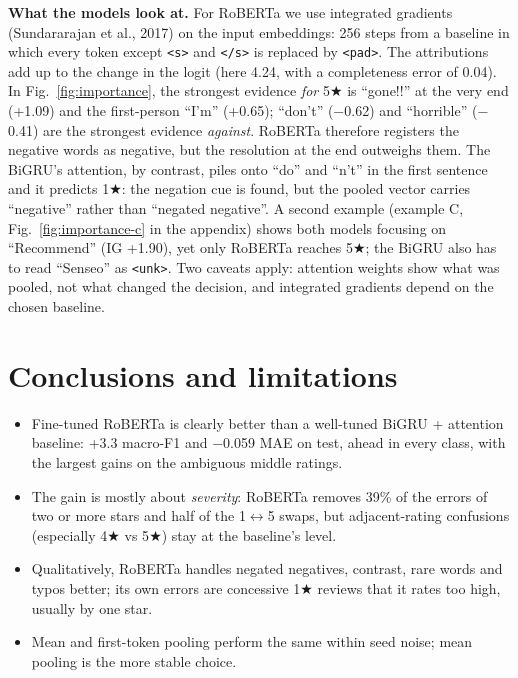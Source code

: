 \documentclass[10pt,a4paper]{article}
\newcommand{\st}[1]{#1$\bigstar$}
\newcommand{\code}[1]{\texttt{#1}}
\begin{document}
\textbf{What the models look at.} For RoBERTa we use integrated gradients (Sundararajan et al., 2017) on the input
embeddings: 256 steps from a baseline in which every token except \code{<s>} and \code{</s>} is replaced by
\code{<pad>}. The attributions add up to the change in the logit (here 4.24, with a completeness error of 0.04).
In Fig.~\ref{fig:importance}, the strongest evidence \emph{for} \st{5} is ``gone!!'' at the very end (+1.09) and
the first-person ``I'm'' (+0.65); ``don't'' ($-$0.62) and ``horrible'' ($-$0.41) are the strongest evidence
\emph{against}. RoBERTa therefore registers the negative words as negative, but the resolution at the end outweighs
them. The BiGRU's attention, by contrast, piles onto ``do'' and ``n't'' in the first sentence and it predicts \st{1}:
the negation cue is found, but the pooled vector carries ``negative'' rather than ``negated negative''. A second
example (example C, Fig.~\ref{fig:importance-c} in the appendix) shows both models focusing on ``Recommend'' (IG +1.90),
yet only RoBERTa reaches \st{5}; the BiGRU also has to read ``Senseo'' as \code{<unk>}. Two caveats apply: attention
weights show what was pooled, not what changed the decision, and integrated gradients depend on the chosen baseline.

\section{Conclusions and limitations}

\begin{itemize}
\item Fine-tuned RoBERTa is clearly better than a well-tuned BiGRU + attention baseline: +3.3 macro-F1 and $-$0.059
MAE on test, ahead in every class, with the largest gains on the ambiguous middle ratings.
\item The gain is mostly about \emph{severity}: RoBERTa removes 39\% of the errors of two or more stars and half of the
1$\leftrightarrow$5 swaps, but adjacent-rating confusions (especially \st{4} vs \st{5}) stay at the baseline's level.
\item Qualitatively, RoBERTa handles negated negatives, contrast, rare words and typos better; its own errors are
concessive \st{1} reviews that it rates too high, usually by one star.
\item Mean and first-token pooling perform the same within seed noise; mean pooling is the more stable choice.
\end{itemize}
\end{document}
